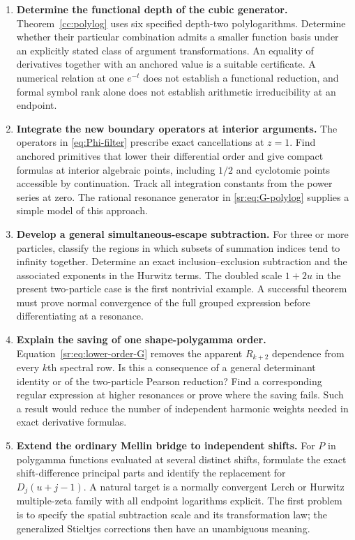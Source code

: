 \begin{enumerate}[leftmargin=*,label=\textbf{Q\arabic*.}]
\item \textbf{Determine the functional depth of the cubic generator.}
Theorem~\ref{cc:polylog} uses six specified depth-two polylogarithms.
Determine whether their particular combination admits a smaller function
basis under an explicitly stated class of argument transformations.
An equality of derivatives together with an anchored value is a suitable
certificate. A numerical relation at one $e^{-t}$ does not establish a
functional reduction, and formal symbol rank alone does not establish
arithmetic irreducibility at an endpoint.

\item \textbf{Integrate the new boundary operators at interior arguments.}
The operators in \eqref{eq:Phi-filter} prescribe exact cancellations at
$z=1$. Find anchored primitives that lower their differential order and
give compact formulas at interior algebraic points, including $1/2$ and
cyclotomic points accessible by continuation. Track all integration
constants from the power series at zero. The rational resonance generator
in \eqref{sr:eq:G-polylog} supplies a simple model of this approach.

\item \textbf{Develop a general simultaneous-escape subtraction.}
For three or more particles, classify the regions in which subsets of
summation indices tend to infinity together. Determine an exact
inclusion--exclusion subtraction and the associated exponents in the
Hurwitz terms. The doubled scale $1+2u$ in the present two-particle
case is the first nontrivial example. A successful theorem must prove
normal convergence of the full grouped expression before differentiating
at a resonance.

\item \textbf{Explain the saving of one shape-polygamma order.}
Equation~\eqref{sr:eq:lower-order-G} removes the apparent $R_{k+2}$
dependence from every $k$th spectral row. Is this a consequence of a
general determinant identity or of the two-particle Pearson reduction?
Find a corresponding regular expression at higher resonances or prove
where the saving fails. Such a result would reduce the number of
independent harmonic weights needed in exact derivative formulas.

\item \textbf{Extend the ordinary Mellin bridge to independent shifts.}
For $P$ in polygamma functions evaluated at several distinct shifts,
formulate the exact shift-difference principal parts and identify the
replacement for $D_j(u+j-1)$. A natural target is a normally convergent
Lerch or Hurwitz multiple-zeta family with all endpoint logarithms
explicit. The first problem is to specify the spatial subtraction scale
and its transformation law; the generalized Stieltjes corrections then
have an unambiguous meaning.


\end{enumerate}
